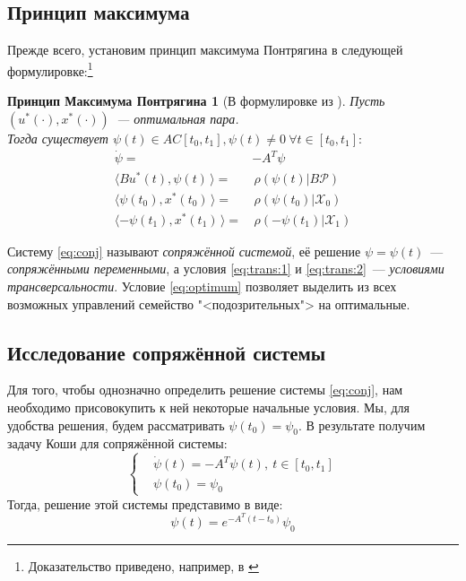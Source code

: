 \documentclass[11pt, oneside, final]{article}
\theoremstyle{break}
\newtheorem*{PMP}{Принцип Максимума Понтрягина}
\numberwithin{equation}{section}
\theoremstyle{plain}
\theoremstyle{definition}
\newcommand{\scalar}[2]{\langle #1, #2\,\rangle}
\begin{document}
    \subsection{Принцип максимума} %
    \label{sub:maximum}
    Прежде всего, установим принцип максимума Понтрягина в следующей формулировке:\footnote{Доказательство приведено, например, в \cite{Pontr'yaginEtAl:maximum}}
    \begin{PMP}[В формулировке из \cite{RoublevTochilin:matlab}]
        \label{th:max}
        Пусть \((u^{*}(\cdot), x^{*}(\cdot))\)~--- оптимальная пара. \\ Тогда существует \(\psi(t) \in AC[t_0, t_1], \psi(t) \neq 0 \ \forall t \in [t_0, t_1]\!: \)
        \begin{align}
            \dot \psi =& -\!A^{T}\psi \label{eq:conj} \\
            \scalar{Bu^{*}(t)}{\psi(t)} =& \, \rho(\psi(t)|B\mathcal{P}) \label{eq:optimum} \\ 
            \scalar{\psi(t_0)}{x^{*}(t_0)} =& \, \rho(\psi(t_0)|\mathcal{X}_0) \label{eq:trans:1} \\
            \scalar{-\psi(t_1)}{x^{*}(t_1)} =& \, \rho(-\psi(t_1)|\mathcal{X}_1) \label{eq:trans:2}            
        \end{align}
    \end{PMP}
    \noindent Систему \eqref{eq:conj} называют \emph{сопряжённой системой}, её решение \(\psi = \psi(t)\)~--- \emph{сопряжёнными переменными}, а условия \eqref{eq:trans:1} и \eqref{eq:trans:2}~--- \emph{условиями трансверсальности}. Условие \eqref{eq:optimum} позволяет выделить из всех возможных управлений семейство "<подозрительных">  на оптимальные. \\
    \subsection{Исследование сопряжённой системы} %
    \label{sub:conjugate}
    Для того, чтобы однозначно определить решение системы \eqref{eq:conj}, нам необходимо присовокупить к ней некоторые начальные условия. Мы, для удобства решения, будем рассматривать \(\psi(t_0) = \psi_0\). В результате получим задачу Коши
    для сопряжённой системы:
    \begin{equation}
        \left\{
        \label{eq:cauchy}
        \begin{aligned}
            & \dot \psi(t) = -\!A^{T}\psi(t), \ t \in [t_0, t_1] \\
            & \psi(t_0) = \psi_0 
        \end{aligned}
        \right.
    \end{equation} 
    Тогда, решение этой системы представимо в виде:
    \begin{equation}
        \label{eq:psi_final}
        \psi(t) = e^{-A^{T}(t - t_0)}\psi_0
    \end{equation}
\end{document}
